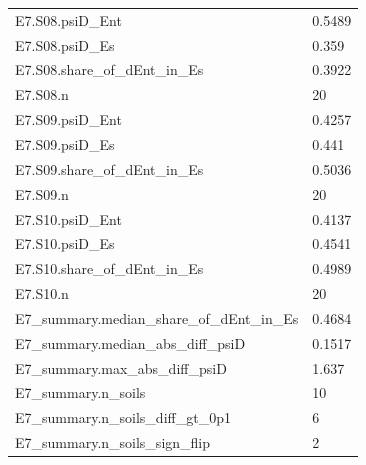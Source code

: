 {\begin{longtable}{p{}p{}}
{}E7.S08.psiD\_Ent & 0.5489\\
{}E7.S08.psiD\_Es & 0.359\\
{}E7.S08.share\_of\_dEnt\_in\_Es & 0.3922\\
{}E7.S08.n & 20\\
{}E7.S09.psiD\_Ent & 0.4257\\
{}E7.S09.psiD\_Es & 0.441\\
{}E7.S09.share\_of\_dEnt\_in\_Es & 0.5036\\
{}E7.S09.n & 20\\
{}E7.S10.psiD\_Ent & 0.4137\\
{}E7.S10.psiD\_Es & 0.4541\\
{}E7.S10.share\_of\_dEnt\_in\_Es & 0.4989\\
{}E7.S10.n & 20\\
{}E7\_summary.median\_share\_of\_dEnt\_in\_Es & 0.4684\\
{}E7\_summary.median\_abs\_diff\_psiD & 0.1517\\
{}E7\_summary.max\_abs\_diff\_psiD & 1.637\\
{}E7\_summary.n\_soils & 10\\
{}E7\_summary.n\_soils\_diff\_gt\_0p1 & 6\\
{}E7\_summary.n\_soils\_sign\_flip & 2\\
\bottomrule\end{longtable}}

